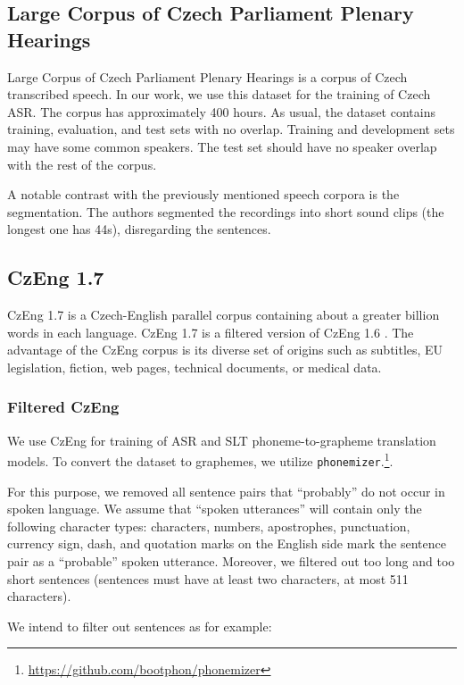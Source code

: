 \subsection{Large Corpus of Czech Parliament Plenary Hearings}
Large Corpus of Czech Parliament Plenary Hearings  is a corpus of Czech transcribed speech. In our work, we use this dataset for the training of Czech ASR. The corpus has approximately 400 hours. As usual, the dataset contains training, evaluation, and test sets with no overlap. Training and development sets may have some common speakers. The test set should have no speaker overlap with the rest of the corpus.

A notable contrast with the previously mentioned speech corpora is the segmentation. The authors segmented the recordings into short sound clips (the longest one has 44s), disregarding the sentences.

\subsection{CzEng 1.7}
CzEng 1.7 is a Czech-English parallel corpus containing about a greater billion words in each language. CzEng 1.7 is a filtered version of CzEng 1.6 . The advantage of the CzEng corpus is its diverse set of origins such as subtitles, EU legislation, fiction, web pages, technical documents, or medical data. 

\subsubsection{Filtered CzEng}
\label{filtered_czeng}
We use CzEng for training of ASR and SLT phoneme-to-grapheme translation models. To convert the dataset to graphemes, we utilize \texttt{phone\-mi\-zer}.\footnote{\url{https://github.com/bootphon/phonemizer}}.

For this purpose, we removed all sentence pairs that ``probably'' do not occur in spoken language. We assume that ``spoken utterances'' will contain only the following character types: characters, numbers, apostrophes, punctuation, currency sign, dash, and quotation marks on the English side mark the sentence pair as a ``probable'' spoken utterance. Moreover, we filtered out too long and too short sentences (sentences must have at least two characters, at most 511 characters).

We intend to filter out sentences as for example: \\

